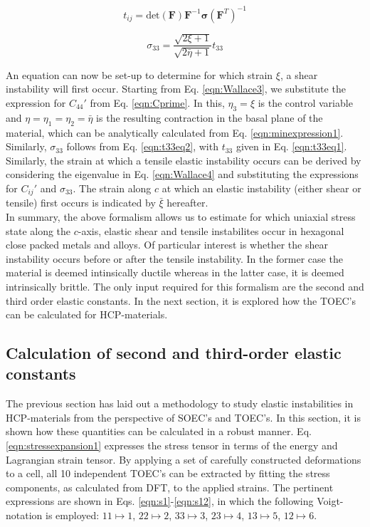 \documentclass[showpacs,aps,floatfix,prb,reprint,superscriptaddress]{revtex4-1}
\begin{document}
\begin{equation}
\label{eqn:stressconversion1} 
t_{ij} = \text{det} \left(\bm{F}\right) \bm{F}^{-1} \bm{\sigma} \left(\bm{F}^{T}\right)^{-1}
\end{equation}


\begin{equation}
\label{eqn:t33eq2} 
\sigma_{33}  = \frac{\sqrt{2 \xi + 1}}{\sqrt{2 \bar{\eta} + 1}}t_{33}
\end{equation}

An equation can now be set-up to determine for which strain $\xi$, a shear instability will first occur. Starting from Eq. \ref{eqn:Wallace3}, we substitute the expression for $C_{44}'$ from Eq. \ref{eqn:Cprime}. In this, $\eta_{3} = \xi$ is the control variable and $\eta = \eta_{1} = \eta_{2} = \bar{\eta}$ is the resulting contraction in the basal plane of the material, which can be analytically calculated from Eq. \ref{eqn:minexpression1}. Similarly, $\sigma_{33}$ follows from Eq. \ref{eqn:t33eq2}, with $t_{33}$ given in Eq. \ref{eqn:t33eq1}. Similarly, the strain at which a tensile elastic instability occurs can be derived by considering the eigenvalue in Eq. \ref{eqn:Wallace4} and substituting the expressions for $C_{ij}'$ and $\sigma_{33}$. The strain along $c$ at which an elastic instability (either shear or tensile) first occurs is indicated by $\bar{\xi}$ hereafter. \\

In summary, the above formalism allows us to estimate for which uniaxial stress state along the $c$-axis, elastic shear and tensile instabilites occur in hexagonal close packed metals and alloys. Of particular interest is whether the shear instability occurs before or after the tensile instability. In the former case the material is deemed intinsically ductile whereas in the latter case, it is deemed intrinsically brittle. The only input required for this formalism are the second and third order elastic constants. In the next section, it is explored how the TOEC's can be calculated for HCP-materials.


\subsection{Calculation of second and third-order elastic constants}
The previous section has laid out a methodology to study elastic instabilities in HCP-materials from the perspective of SOEC's and TOEC's. In this section, it is shown how these quantities can be calculated in a robust manner. Eq. \ref{eqn:stressexpansion1} expresses the stress tensor in terms of the energy and Lagrangian strain tensor. By applying a set of carefully constructed deformations to a cell, all 10 independent TOEC's can be extracted by fitting the stress components, as calculated from DFT, to the applied strains. The pertinent expressions are shown in Eqs. \ref{eqn:s1}-\ref{eqn:s12}, in which the following Voigt-notation is employed: $11 \mapsto 1$, $22 \mapsto 2$, $33 \mapsto 3$, $23 \mapsto 4$, $13 \mapsto 5$, $12 \mapsto 6$.
\end{document}
